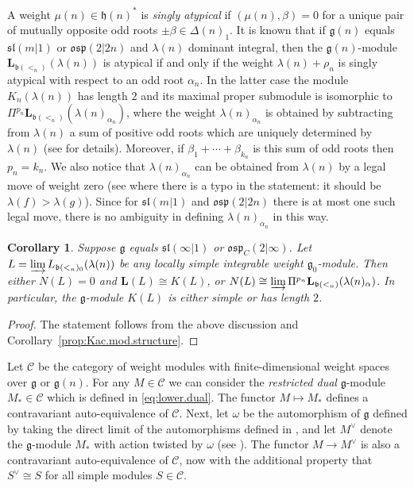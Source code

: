 \documentclass[12pt]{amsart}
\newcommand\g{\mathfrak{g}}
\newcommand\fh{\mathfrak{h}}
\newcommand\fb{\mathfrak{b}}
\newcommand\fsl{\mathfrak{sl}}
\newcommand\fosp{\mathfrak{osp}}
\newcommand\D{\Delta}
\newcommand\cC{\mathcal{C}}
\newcommand\bL{\mathbf{L}}
\theoremstyle{plain}
\newtheorem{cor}[theo]{Corollary}
\theoremstyle{definition}
\numberwithin{equation}{section}
\begin{document}
A weight $\mu(n)\in \fh(n)^*$ is \emph{singly atypical} if $(\mu(n), \beta)=0$ for a unique pair of mutually opposite odd roots $\pm \beta\in \D(n)_1$. It is known that if $\g(n)$ equals $\fsl(m|1)$ or $\fosp(2|2n)$ and $\lambda(n)$ dominant integral, then the $\g(n)$-module $\bL_{\fb(<_n)}(\lambda(n))$ is atypical if and only if the weight $\lambda(n)+\rho_n$ is singly atypical with respect to an odd root $\alpha_n$. In the latter case the module $K_n(\lambda(n))$ has length $2$ and its maximal proper submodule  is isomorphic to $\Pi^{p_n} \bL_{\fb(<_n)}(\lambda(n)_{\alpha_n})$, where the weight $\lambda(n)_{\alpha_n}$ is obtained by subtracting from $\lambda(n)$ a sum of positive odd roots which are uniquely determined by $\lambda(n)$ (see \cite[\S~6~and~7]{VHKT90} for details). Moreover, if $\beta_1+\cdots + \beta_{k_n}$ is this sum of odd roots then $p_n = k_n$. We also notice that $\lambda(n)_{\alpha_n}$ can be obtained from $\lambda(n)$ by a legal move of weight zero (see \cite[Corollary~6.4]{MS11} where there is a typo in the statement: it should be $\lambda(f)>\lambda(g)$). Since for $\fsl(m|1)$ and $\fosp(2|2n)$ there is at most one such legal move, there is no ambiguity in defining $\lambda(n)_{\alpha_n}$ in this way.

\begin{cor}\label{cor:Kac.mod.structure}
Suppose $\g$ equals $\fsl(\infty|1)$ or $\fosp_C(2|\infty)$.  Let $L = \varinjlim L_{\fb(<_n)_0}(\lambda(n))$ be any locally simple integrable weight $\g_0$-module. Then either $N(L)=0$ and  $\bL(L)\cong K(L)$, or $N(L)\cong \varinjlim  \Pi^{p_n}\bL_{\fb(<_n)}(\lambda(n)_\alpha)$. In particular, the $\g$-module $K(L)$ is either simple or has length $2$.
\end{cor}
\begin{proof}
The statement follows from  the above discussion and Corollary~\ref{prop:Kac.mod.structure}.
\end{proof}

Let $\cC$ be the category of weight modules with finite-dimensional weight spaces over $\g$ or $\g(n)$. For any $M\in \cC$ we can consider the \emph{restricted dual} $\g$-module $M_*\in \cC$ which is defined in \eqref{eq:lower.dual}. The  functor $M\mapsto M_*$ defines a contravariant auto-equivalence of $\cC$. Next, let $\omega$ be the automorphism of $\g$ defined by taking the direct limit of the automorphisms defined in \cite[\S~5.2]{Mus12}, and let $M^\vee$ denote the $\g$-module $M_*$ with action twisted by $\omega$ (see \cite[pg. 20]{MS11}). The functor $M\to M^\vee$ is also a contravariant auto-equivalence of $\cC$, now with the additional property that $S^\vee\cong S$ for all simple modules $S\in \cC$.
\end{document}
